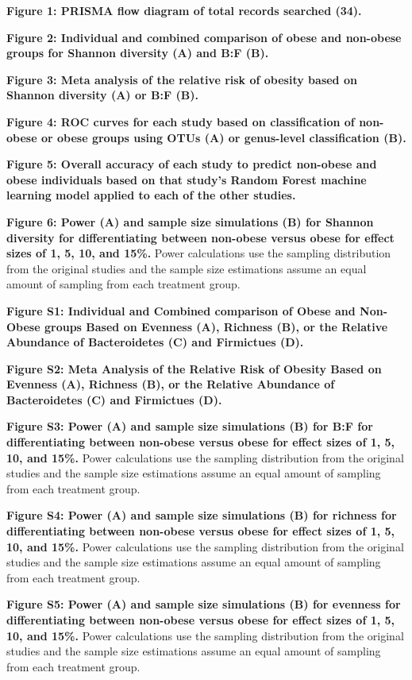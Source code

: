 \documentclass[12pt,]{article}
\begin{document}
\newpage

\textbf{Figure 1: PRISMA flow diagram of total records searched (34).}

\textbf{Figure 2: Individual and combined comparison of obese and
non-obese groups for Shannon diversity (A) and B:F (B).}

\textbf{Figure 3: Meta analysis of the relative risk of obesity based on
Shannon diversity (A) or B:F (B).}

\textbf{Figure 4: ROC curves for each study based on classification of
non-obese or obese groups using OTUs (A) or genus-level classification
(B).}

\textbf{Figure 5: Overall accuracy of each study to predict non-obese
and obese individuals based on that study's Random Forest machine
learning model applied to each of the other studies.}

\textbf{Figure 6: Power (A) and sample size simulations (B) for Shannon
diversity for differentiating between non-obese versus obese for effect
sizes of 1, 5, 10, and 15\%.} Power calculations use the sampling
distribution from the original studies and the sample size estimations
assume an equal amount of sampling from each treatment group.

\newpage

\textbf{Figure S1: Individual and Combined comparison of Obese and
Non-Obese groups Based on Evenness (A), Richness (B), or the Relative
Abundance of Bacteroidetes (C) and Firmictues (D).}

\textbf{Figure S2: Meta Analysis of the Relative Risk of Obesity Based
on Evenness (A), Richness (B), or the Relative Abundance of
Bacteroidetes (C) and Firmictues (D).}

\textbf{Figure S3: Power (A) and sample size simulations (B) for B:F for
differentiating between non-obese versus obese for effect sizes of 1, 5,
10, and 15\%.} Power calculations use the sampling distribution from the
original studies and the sample size estimations assume an equal amount
of sampling from each treatment group.

\textbf{Figure S4: Power (A) and sample size simulations (B) for
richness for differentiating between non-obese versus obese for effect
sizes of 1, 5, 10, and 15\%.} Power calculations use the sampling
distribution from the original studies and the sample size estimations
assume an equal amount of sampling from each treatment group.

\textbf{Figure S5: Power (A) and sample size simulations (B) for
evenness for differentiating between non-obese versus obese for effect
sizes of 1, 5, 10, and 15\%.} Power calculations use the sampling
distribution from the original studies and the sample size estimations
assume an equal amount of sampling from each treatment group.
\end{document}
